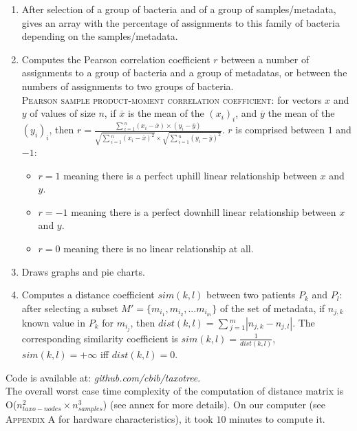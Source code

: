 \documentclass{report}
\begin{document}
\begin{enumerate}
\item After selection of a group of bacteria and of a group of samples/metadata, gives an array with the percentage of assignments to this family of bacteria depending on the samples/metadata.
\item Computes the Pearson correlation coefficient $r$ between a number of assignments to a group of bacteria and a group of metadatas, or between the numbers of assignments to two groups of bacteria. \\

\textsc{Pearson sample product-moment correlation coefficient:} \cite{Pearson} for vectors $x$ and $y$ of values of size $n$, if $\overline{x}$ is the mean of the $(x_{i})_{i}$, and $\overline{y}$ the mean of the $(y_{i})_{i}$, then $r = \frac{\sum{_{i = 1}^{n}}{(x_{i} - \overline{x}) \times (y_{i} - \overline{y})}}{\sqrt{\sum{_{i = 1}^{n}}{(x_{i} - \overline{x})^{2}}} \times \sqrt{\sum{_{i = 1}^{n}}{(y_{i} - \overline{y})^{2}}}}$. $r$ is comprised between $1$ and $-1$:
\begin{itemize} 
\item $r = 1$ meaning there is a perfect uphill linear relationship between $x$ and $y$.
\item $r = -1$ meaning there is a perfect downhill linear relationship between $x$ and $y$.
\item $r = 0$ meaning there is no linear relationship at all.
\end{itemize}

\item Draws graphs and pie charts.
\item Computes a distance coefficient $sim(k,l)$ between two patients $P_{k}$ and $P_{l}$: after selecting a subset $M' = \{ m_{i_{1}}, m_{i_{2}}, ... m_{i_{m}}\}$ of the set of metadata, if $n_{j,k}$ known value in $P_{k}$ for $m_{i_{j}}$, then $dist(k,l) = \sum{_{j = 1}^{m}}{|n_{j,k} - n_{j,l}|}$. The corresponding similarity coefficient is $sim(k,l) = \frac{1}{dist(k,l)}$, $sim(k,l) = +\infty$ iff $dist(k,l) = 0$.
\end{enumerate}

Code is available at: \emph{github.com/cbib/taxotree}.\\

The overall worst case time complexity of the computation of distance matrix is O($n_{taxo-nodes}^{2} \times n_{samples}^{3}$) (see annex for more details). On our computer (see \textsc{Appendix A} for hardware characteristics), it took $10$ minutes to compute it.
\end{document}
